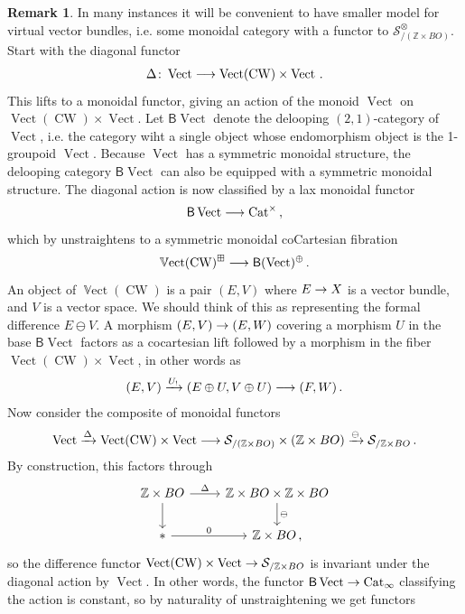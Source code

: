 \documentclass[10pt]{amsart}
\numberwithin{equation}{section}
\theoremstyle{definition}
\newtheorem{rem}[prop]{Remark}
\DeclareMathOperator{\Vect}{Vect}
\DeclareMathOperator{\bVect}{\mathbb{V}ect}
\DeclareMathOperator{\CW}{CW}
\newcommand{\Cat}{\mathrm{Cat}\vphantom{t}}
\newcommand{\bZ}{\mathbb{Z}}
\newcommand{\cS}{\mathcal{S}}
\newcommand{\sfB}{\mathsf{B}}
\renewcommand{\to}{\mathchoice{\longrightarrow}{\rightarrow}{}{}}
\begin{document}
\begin{rem}\label{rem:bVect}
	In many instances it will be convenient to have smaller model for virtual vector bundles, i.e. some monoidal category with a functor to $\cS_{/ (\bZ\times BO)}^{\otimes}$. Start with the diagonal functor
	\begin{align*}
		\Delta \colon \Vect \to \Vect(\CW)\times \Vect \,.
	\end{align*}
	This lifts to a monoidal functor, giving an action of the monoid $\Vect$ on $\Vect(\CW)\times \Vect$. Let $\sfB\Vect$ denote the delooping $(2,1)$-category of $\Vect$, i.e. the category wiht a single object whose endomorphism object is the 1-groupoid $\Vect$. Because $\Vect$ has a symmetric monoidal structure, the delooping category $\sfB\Vect$ can also be equipped with a symmetric monoidal structure. The diagonal action is now classified by a lax monoidal functor
	\begin{align*}
		\sfB \Vect \to \Cat^{\times}\,,
	\end{align*}
	which by \cite{ramzi2026monoidal} unstraightens to a symmetric monoidal coCartesian fibration
  \[\bVect(\CW)^{\boxplus} \to \sfB (\Vect)^{\oplus} \,.
  \]
  An object of $\bVect(\CW)$ is a pair $(E,V)$ where $E\to X$ is a vector bundle, and $V$ is a vector space. We should think of this as representing the formal difference $E\ominus V$.
  A morphism $(E,V) \to (E,W)$ covering a morphism $U$ in the base $\sfB \Vect$ factors as a cocartesian lift followed by a morphism in the fiber $\Vect(\CW)\times \Vect$, in other words as
	\begin{align*}
		(E,V) \xrightarrow{U_{!}} (E\oplus U, V\oplus U) \to (F, W) \,.
	\end{align*}
	Now consider the composite of monoidal functors
	\begin{align*}
		\Vect \xrightarrow{\Delta} \Vect(\CW) \times \Vect \to \cS_{/ (\bZ\times BO)} \times (\bZ\times BO) \xrightarrow{ \ominus} \cS_{/\bZ\times BO} \,.
	\end{align*}
	By construction, this factors through
	\begin{equation*}
		\begin{tikzcd}
			\bZ\times BO \arrow[r, "\Delta"] \arrow[d]      &   \bZ\times BO \times \bZ\times BO  \arrow[d,"\ominus"] \\
			\ast \arrow[r, "0"]               &   \bZ\times BO \, ,
		\end{tikzcd}
	\end{equation*}
	so the difference functor $\Vect(\CW) \times \Vect \to \cS_{/\bZ\times BO}$ is invariant under the diagonal action by $\Vect$. In other words, the functor $\sfB \Vect \to \Cat_{\infty}$ classifying the action is constant, so by naturality of unstraightening we get functors

\end{rem}
\end{document}
